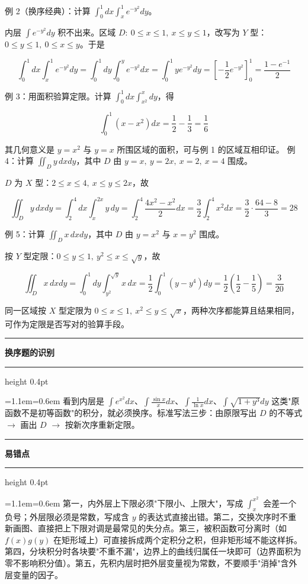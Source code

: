 \documentclass[11pt,openany,UTF8]{ctexbook}
\newcommand{\callouthead}[2]{%
  \par\addvspace{7pt}\noindent
  {\color{#1}\rule[-0.15em]{3pt}{1.05em}}\hspace{0.5em}%
  {\bfseries\color{#1}#2}\par\nobreak\vspace{-0.35em}%
  {\color{rulesep}\hrule height 0.4pt}\nobreak\vspace{0.45em}%
  \begingroup\small\setlength{\parindent}{0pt}%
  \leftskip=1.1em\rightskip=0.6em\noindent\ignorespaces}
\newcommand{\calloutend}{\par\endgroup\addvspace{7pt}}
\newenvironment{callkey}[1]{\callouthead{keybar}{#1}}{\calloutend}
\newenvironment{callwarn}[1]{\callouthead{warnbar}{#1}}{\calloutend}
\begin{document}
例 2（换序经典）：计算 $\displaystyle\int_{0}^{1}dx\int_{x}^{1}e^{-y^{2}}dy$。

内层 $\int e^{-y^{2}}dy$ 积不出来。区域 $D:\ 0\le x\le 1,\ x\le y\le 1$，改写为 $Y$ 型：$0\le y\le 1,\ 0\le x\le y$。于是

\[\int_{0}^{1}dx\int_{x}^{1}e^{-y^{2}}dy=\int_{0}^{1}dy\int_{0}^{y}e^{-y^{2}}dx=\int_{0}^{1}ye^{-y^{2}}dy=\left[-\frac12e^{-y^{2}}\right]_{0}^{1}=\frac{1-e^{-1}}{2}\]

例 3：用面积验算定限。计算 $\displaystyle\int_{0}^{1}dx\int_{x^{2}}^{x}dy$，得

\[\int_{0}^{1}\left(x-x^{2}\right)dx=\frac12-\frac13=\frac16\]

其几何意义是 $y=x^{2}$ 与 $y=x$ 所围区域的面积，可与例 1 的区域互相印证。 例 4：计算 $\displaystyle\iint_{D}y\,dxdy$，其中 $D$ 由 $y=x,\ y=2x,\ x=2,\ x=4$ 围成。

$D$ 为 $X$ 型：$2\le x\le 4,\ x\le y\le 2x$，故

\[\iint_{D}y\,dxdy=\int_{2}^{4}dx\int_{x}^{2x}y\,dy=\int_{2}^{4}\frac{4x^{2}-x^{2}}{2}dx=\frac32\int_{2}^{4}x^{2}dx=\frac32\cdot\frac{64-8}{3}=28\]

例 5：计算 $\displaystyle\iint_{D}x\,dxdy$，其中 $D$ 由 $y=x^{2}$ 与 $x=y^{2}$ 围成。

按 $Y$ 型定限：$0\le y\le 1,\ y^{2}\le x\le \sqrt{y}$，故

\[\iint_{D}x\,dxdy=\int_{0}^{1}dy\int_{y^{2}}^{\sqrt{y}}x\,dx=\frac12\int_{0}^{1}\left(y-y^{4}\right)dy=\frac12\left(\frac12-\frac15\right)=\frac{3}{20}\]

同一区域按 $X$ 型定限为 $0\le x\le 1,\ x^{2}\le y\le\sqrt{x}$，两种次序都能算且结果相同，可作为定限是否写对的验算手段。

\begin{callkey}{换序题的识别}
看到内层是 $\int e^{x^{2}}dx$、$\int\frac{\sin x}{x}dx$、$\int\frac{1}{\ln x}dx$、$\int\sqrt{1+y^{3}}dy$ 这类"原函数不是初等函数"的积分，就必须换序。标准写法三步：由原限写出 $D$ 的不等式 $\to$ 画出 $D$ $\to$ 按新次序重新定限。

\end{callkey}

\begin{callwarn}{易错点}
第一，内外层上下限必须"下限小、上限大"，写成 $\int_{x}^{x^{2}}$ 会差一个负号；外层限必须是常数，写成含 $y$ 的表达式直接出错。第二，交换次序时不重新画图、直接把上下限对调是最常见的失分点。第三，被积函数可分离时（如 $f(x)g(y)$ 在矩形域上）可直接拆成两个定积分之积，但非矩形域不能这样拆。第四，分块积分时各块要"不重不漏"，边界上的曲线归属任一块即可（边界面积为零不影响积分值）。第五，先积内层时把外层变量视为常数，不要顺手"消掉"含外层变量的因子。

\end{callwarn}
\end{document}
